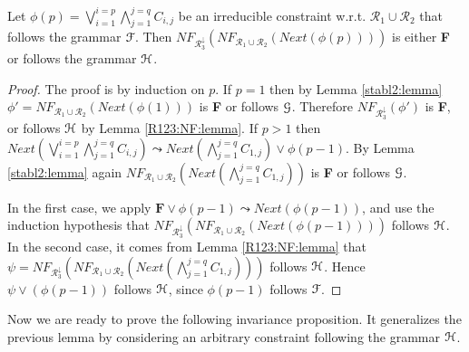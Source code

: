 \documentclass[submission,copyright,creativecommons]{eptcs}
\newcommand \Eu[1]{\EuScript{#1}}
\numberwithin{subcase}{case}
\begin{document}
\begin{lemma}
\label{invariance:next:lemma}
Let  $\phi(p)=\bigvee_{i=1}^{i=p}\bigwedge_{j=1}^{j=q}C_{i,j}$ 
be an irreducible constraint
w.r.t. $\mathcal{R}_1\cup \mathcal{R}_2$ that follows the grammar $\Eu{F}$.
Then  $\textit{NF}_{ \mathcal{R}_3^{\downarrow}}(\textit{NF}_{\mathcal{R}_1\cup \mathcal{R}_2}(Next(\phi(p))))$ 
is either \textbf{F} or follows the grammar $\Eu{H}$.
\end{lemma}
\begin{proof}
The proof is by induction on $p$. If $p=1$ then by Lemma \ref{stabl2:lemma}
$\phi' = \textit{NF}_{\mathcal{R}_1\cup \mathcal{R}_2}(Next(\phi(1)))$ is \textbf{F} or
follows  $\Eu{G}$. Therefore $\textit{NF}_{\mathcal{R}_3^{\downarrow}}(\phi')$ is 
\textbf{F}, or  follows  $\Eu{H}$ by Lemma \ref{R123:NF:lemma}. If $p>1$
then $Next(\bigvee_{i=1}^{i=p}\bigwedge_{j=1}^{j=q}C_{i,j}) \leadsto
Next(\bigwedge_{j=1}^{j=q}C_{1,j}) \lor \phi(p-1)$.
 By  Lemma \ref{stabl2:lemma} again 
$\textit{NF}_{\mathcal{R}_1\cup \mathcal{R}_2}(Next(\bigwedge_{j=1}^{j=q}C_{1,j}))$
  is \textbf{F} or follows $\Eu{G}$. 
  
  In the first case, we apply
  $\textbf{F} \lor \phi(p-1) \leadsto Next(\phi(p-1))$, and use the
  induction hypothesis that $\textit{NF}_{\mathcal{R}_3^{\downarrow}}(\textit{NF}_{\mathcal{R}_1\cup
\mathcal{R}_2}(Next(\phi(p-1))))$ follows $\Eu{H}$.  In the second case, it
comes from Lemma \ref{R123:NF:lemma} that
 $\psi=\textit{NF}_{\mathcal{R}_3^{\downarrow}}(\textit{NF}_{\mathcal{R}_1\cup
 \mathcal{R}_2}(Next(\bigwedge_{j=1}^{j=q}C_{1,j})))$
follows $\Eu{H}$. Hence $\psi \lor (\phi(p-1))$ follows $\Eu{H}$, since
$\phi(p-1)$ follows $\Eu{F}$.
\end{proof}

Now we are ready to prove the following invariance proposition. It generalizes
the previous lemma by considering an arbitrary constraint following the grammar
$\Eu{H}$.
\end{document}
